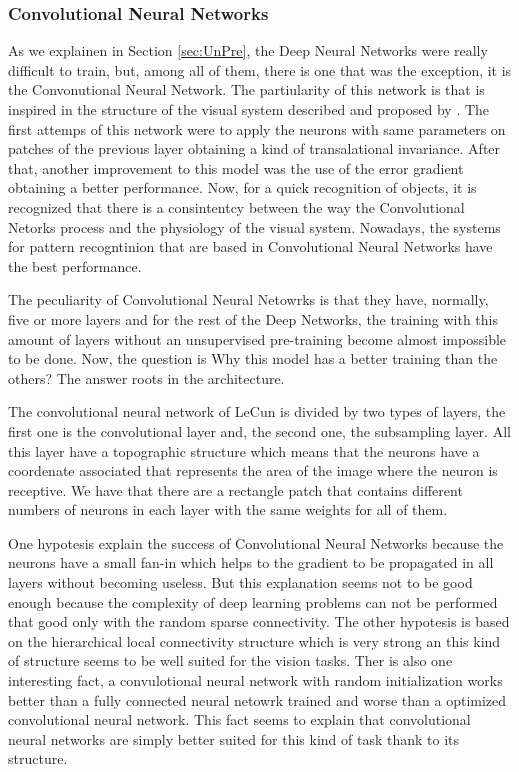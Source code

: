 \documentclass[12pt]{article}
\begin{document}
\subsubsection{Convolutional Neural Networks}
As we explainen in Section \ref{sec:UnPre}, the Deep Neural Networks were really difficult to train, but, among all of them, there is one that was the exception, it is the Convonutional Neural Network. The partiularity of this network is that is inspired in the structure of the visual system described and proposed by \cite{hubel1962receptive}.  The first attemps of this network were to apply the neurons with same parameters on patches of the previous layer obtaining a kind of transalational invariance. After that, another improvement to this model was the use of the error gradient obtaining a better performance. Now, for a quick recognition of objects, it is recognized that there is a consintentcy between the way the Convolutional Netorks process and the physiology of the visual system. Nowadays, the systems for pattern recogntinion that are based in Convolutional Neural Networks have the best performance. 

The peculiarity of Convolutional Neural Netowrks is that they have, normally, five or more layers and for the rest of the Deep Networks, the training with this amount of layers without an unsupervised pre-training become almost impossible to be done. Now, the question is Why this model has a better training than the others? The answer roots in the architecture.

The convolutional neural network of LeCun is divided by two types of layers, the first one is the convolutional layer and, the second one, the subsampling layer. All this layer have a topographic structure which means that the neurons have a coordenate associated that represents the area of the image where the neuron is receptive. We have that there are a rectangle patch that contains different numbers of neurons in each layer with the same weights for all of them.

One hypotesis explain the success of Convolutional Neural Networks because the neurons have a small fan-in which helps to the gradient to be propagated in all layers without becoming useless. But this explanation seems not to be good enough because the complexity of deep learning problems can not be performed that good only with the random sparse connectivity. The other hypotesis is based on the hierarchical local connectivity structure which is very strong an this kind of structure seems to be well suited for the vision tasks. Ther is also one interesting fact, a convulotional neural network with random initialization works better than a fully connected neural netowrk trained and worse than a optimized convolutional neural network. This fact seems to explain that convolutional neural networks are simply better suited for this kind of task thank to its structure.
\end{document}
